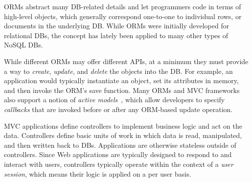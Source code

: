 ORMs abstract many DB-related
details and let programmers code in terms of high-level objects, which
generally correspond one-to-one to individual rows, or documents
in the underlying DB.  While
ORMs were initially developed for relational DBs, the concept has lately
been applied to many other types of NoSQL DBs.  

While different ORMs may offer different APIs, at a minimum they must
provide a way to {\em create}, {\em update}, and {\em delete} the objects into
the DB.  For example, an application would typically instantiate an
object, set its attributes in memory, and then invoke the ORM's save
function.  Many ORMs and MVC frameworks also support a notion of 
{\em active models}~\cite{Fowler:2002:PEA:579257}, which allow
developers to specify {\em callbacks} that are invoked before or after
any ORM-based update operation.  

MVC applications define controllers to implement business logic and
act on the data.  Controllers define basic units of work in which data
is read, manipulated, and then written back to DBs.  Applications are
otherwise stateless outside of controllers.  Since Web applications
are typically designed to respond to and interact with users,
controllers typically operate within the context of a 
{\em user session}, which means their logic is applied on a per user
basis. 


